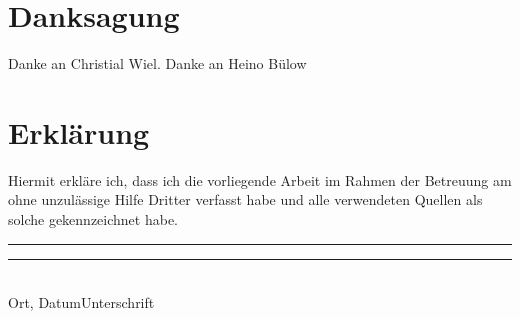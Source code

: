 
\printbibliography
\cleardoublepage
\pagestyle{empty}
\section*{Danksagung} %
Danke an Christial Wiel. Danke an Heino Bülow
\cleardoublepage
\section*{Erklärung}
Hiermit erkläre ich, dass ich die vorliegende Arbeit im Rahmen der Betreuung am
\institut{} ohne unzulässige Hilfe Dritter verfasst habe und alle verwendeten
Quellen als solche gekennzeichnet habe.

\vspace{5\baselineskip}
\noindent
\rule[0.5ex]{20em}{0.5pt}\rule[0.5ex]{10em}{0.5pt}\\
Ort, Datum\hspace{8em}Unterschrift 
